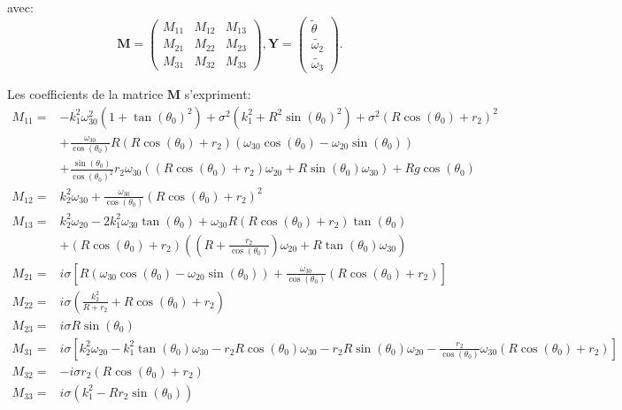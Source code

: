 avec:
$$
\mathbf{M}= \begin{pmatrix}
    M_{11}       & M_{12} & M_{13}  \\
    M_{21}       & M_{22} & M_{23}  \\
    M_{31}       & M_{32} & M_{33} 
\end{pmatrix}
,
\mathbf{Y}= \begin{pmatrix}
    \tilde{\theta}   \\
    \tilde{\omega_2} \\
    \tilde{\omega_3}     
\end{pmatrix}.
$$


Les coefficients de la matrice $\mathbf{M}$ s'expriment:
\begin{align}
    M_{11}=& -k_1^2 \omega_{30}^2(1+\tan(\theta_0)^2)+\sigma^2 (k_1^2+R^2\sin(\theta_0)^2)+ \sigma^2(R\cos(\theta_0)+r_2)^2 \nonumber \\
    &+\frac{\omega_{30}}{\cos(\theta_0)}R(R\cos(\theta_0)+r_2)(\omega_{30}\cos(\theta_0)-\omega_{20}\sin(\theta_0)) \nonumber \\
    &+ \frac{\sin(\theta_0)}{\cos(\theta_0)^2} r_2 \omega_{30}((R\cos(\theta_0)+r_2)\omega_{20}+R\sin(\theta_0)\omega_{30})+Rg\cos(\theta_0) \nonumber \\
    M_{12}=&k_2^2 \omega_{30} +\frac{\omega_{30}}{\cos(\theta_0)}(R\cos(\theta_0)+r_2)^2 \nonumber \\
    M_{13}=&k_2^2 \omega_{20}-2 k_1^2 \omega_{30} \tan(\theta_0)+\omega_{30}R(R\cos(\theta_0)+r_2)\tan(\theta_0)\nonumber \\
    &+ (R \cos(\theta_0)+r_2)((R+\frac{r_2}{\cos(\theta_0)})\omega_{20}+R\tan(\theta_0)\omega_{30}) \nonumber \\
    M_{21}=&i \sigma [R(\omega_{30}\cos(\theta_0)-\omega_{20}\sin(\theta_0))+ \frac{\omega_{30}}{\cos(\theta_0)} (R\cos(\theta_0)+r_2)] \nonumber \\
    M_{22}=& i\sigma (\frac{k_2^2}{R+r_2} + R\cos(\theta_0)+r_2) \nonumber \\
    M_{23}=&i \sigma R \sin(\theta_0) \nonumber \\
    M_{31}=& i \sigma[k_2^2\omega_{20}-k_1^2\tan(\theta_0) \omega_{30}-r_2 R\cos(\theta_0)\omega_{30}-r_2 R\sin(\theta_0)\omega_{20}-\frac{r_2}{\cos(\theta_0)}\omega_{30}(R\cos(\theta_0)+r_2)] \nonumber \\
    M_{32}=&- i \sigma r_2 (R\cos(\theta_0)+r_2) \nonumber \\
    M_{33}=&i \sigma(k_1^2-R r_2 \sin(\theta_0)) 
\label{eq:mat}
\end{align}


